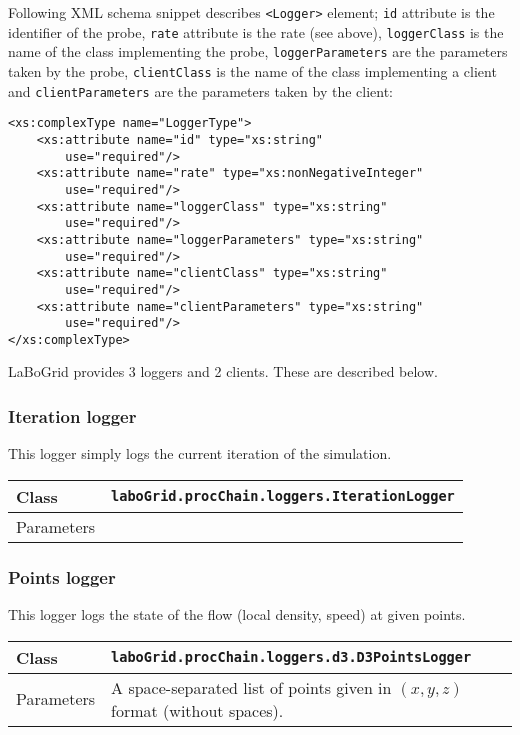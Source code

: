 Following XML schema snippet describes \verb|<Logger>| element;
\texttt{id} attribute is the identifier of the probe, \texttt{rate} attribute
is the rate (see above), \texttt{loggerClass} is the name of the class
implementing the probe, \texttt{loggerParameters} are the parameters taken by
the probe, \texttt{clientClass} is the name of the class implementing a client
and \texttt{clientParameters} are the parameters taken by the client:

\begin{Verbatim}[tabsize=2,frame=lines]
<xs:complexType name="LoggerType">
	<xs:attribute name="id" type="xs:string"
		use="required"/>
	<xs:attribute name="rate" type="xs:nonNegativeInteger"
		use="required"/>
	<xs:attribute name="loggerClass" type="xs:string"
		use="required"/>
	<xs:attribute name="loggerParameters" type="xs:string"
		use="required"/>
	<xs:attribute name="clientClass" type="xs:string"
		use="required"/>
	<xs:attribute name="clientParameters" type="xs:string"
		use="required"/>
</xs:complexType>
\end{Verbatim}

LaBoGrid provides 3 loggers and 2 clients. These are described below.


\subsubsection{Iteration logger}

This logger simply logs the current iteration of the simulation.

\noindent
\begin{tabular}{|p{1.7cm}|p{9.55cm}|}
\hline
Class &
\texttt{laboGrid.procChain.loggers.IterationLogger}\\
\hline
Parameters & \\
\hline
\end{tabular}


\subsubsection{Points logger}

This logger logs the state of the flow (local density, speed) at given points.

\noindent
\begin{tabular}{|p{1.7cm}|p{9.55cm}|}
\hline
Class &
\texttt{laboGrid.procChain.loggers.d3.D3PointsLogger}\\
\hline
Parameters & A space-separated list of points given in $(x,y,z)$ format
(without spaces).\\
\hline
\end{tabular}


